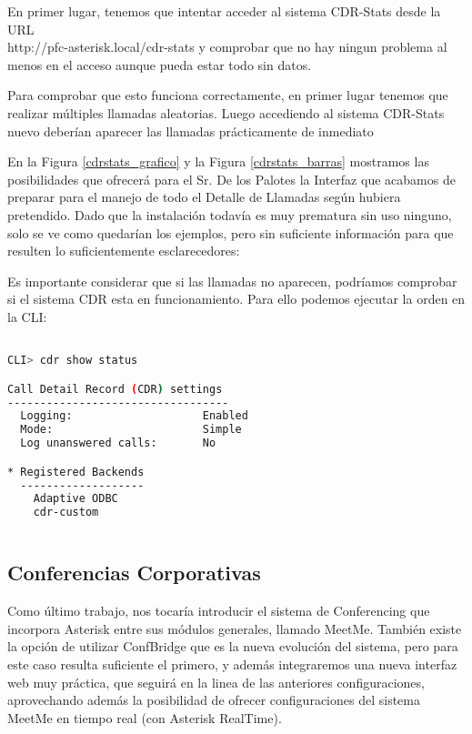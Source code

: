 En primer lugar, tenemos que intentar acceder al sistema CDR-Stats desde la URL \\ http://pfc-asterisk.local/cdr-stats y comprobar que no hay ningun problema al menos en el acceso aunque pueda estar todo sin datos.

Para comprobar que esto funciona correctamente, en primer lugar tenemos que realizar múltiples llamadas aleatorias. Luego accediendo al sistema CDR-Stats nuevo deberían aparecer las llamadas prácticamente de inmediato

En la Figura \ref{cdrstats_grafico} y la Figura \ref{cdrstats_barras} mostramos las posibilidades que ofrecerá para el Sr. De los Palotes la Interfaz que acabamos de preparar para el manejo de todo el Detalle de Llamadas según hubiera pretendido. Dado que la instalación todavía es muy prematura sin uso ninguno, solo se ve como quedarían los ejemplos, pero sin suficiente información para que resulten lo suficientemente esclarecedores:



Es importante considerar que si las llamadas no aparecen, podríamos comprobar si el sistema CDR esta en funcionamiento. Para ello podemos ejecutar la orden en la CLI:
\begin{lstlisting}[language=sh]

CLI> cdr show status

Call Detail Record (CDR) settings
----------------------------------
  Logging:                    Enabled
  Mode:                       Simple
  Log unanswered calls:       No

* Registered Backends
  -------------------
    Adaptive ODBC
    cdr-custom
		
\end{lstlisting}

\newpage

\subsection{Conferencias Corporativas}

Como último trabajo, nos tocaría introducir el sistema de Conferencing que incorpora Asterisk entre sus módulos generales, llamado MeetMe. También existe la opción de utilizar ConfBridge que es la nueva evolución del sistema, pero para este caso resulta suficiente el primero, y además integraremos una nueva interfaz web muy práctica, que seguirá en la linea de las anteriores configuraciones, aprovechando además la posibilidad de ofrecer configuraciones del sistema MeetMe en tiempo real (con Asterisk RealTime).

